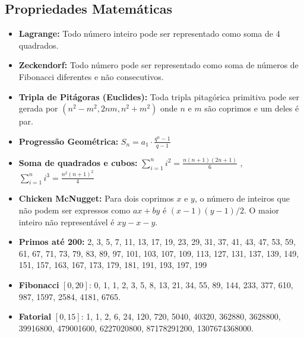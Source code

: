 \subsection{Propriedades Matemáticas}


\begin{small}

\begin{itemize}

    \item \textbf{Lagrange:} Todo número inteiro pode ser representado como soma de 4 quadrados.

    \item \textbf{Zeckendorf:} Todo número pode ser representado como soma de números de Fibonacci diferentes e não consecutivos.

    \item \textbf{Tripla de Pitágoras (Euclides):} Toda tripla pitagórica primitiva pode ser gerada por $(n^2 - m^2, 2nm, n^2 + m^2)$ onde $n$ e $m$ são coprimos e um deles é par.
    
    \item \textbf{Progressão Geométrica:} $S_n = a_1 \cdot \frac{q^n - 1}{q - 1}$

    \item \textbf{Soma de quadrados e cubos:} 
    $\sum_{i=1}^{n} i^2 = \frac{n (n+1) (2n+1)}{6}$ ,
    $\sum_{i=1}^{n} i^3 = \frac{n^2(n+1)^2}{4}$
    
    \item \textbf{Chicken McNugget:} Para dois coprimos $x$ e $y$, o número de inteiros que não podem ser expressos como $ax + by$ é $(x-1)(y-1)/2$. O maior inteiro não representável é $xy - x - y$.

    \item\textbf{Primos até 200:} 2, 3, 5, 7, 11, 13, 17, 19, 23, 29, 31, 37, 41, 43, 47, 53, 59, 61, 67, 71, 73, 79, 83, 89, 97, 101, 103, 107, 109, 113, 127, 131, 137, 139, 149, 151, 157, 163, 167, 173, 179, 181, 191, 193, 197, 199

    \item\textbf{Fibonacci} $[0,20]$: 
    0, 1, 1, 2, 3, 5, 8, 13, 21, 34, 55, 89, 144, 233, 377, 610, 987, 1597, 2584, 4181, 6765.
    
    \item\textbf{Fatorial} $[0,15]$:
    1, 1, 2, 6, 24, 120, 720, 5040, 40320, 362880, 3628800, 39916800, 479001600, 6227020800, 87178291200, 1307674368000.
    

\end{itemize}
\end{small}
